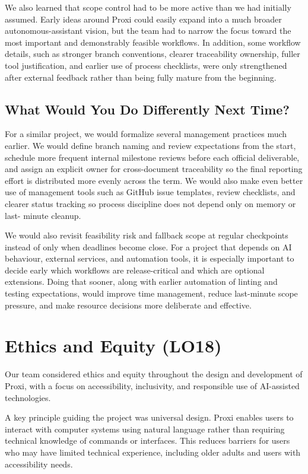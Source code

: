 \documentclass{article}
\begin{document}
We also learned that scope control had to be more active than we had
initially assumed. Early ideas around Proxi could easily expand into a
much broader autonomous-assistant vision, but the team had to narrow the
focus toward the most important and demonstrably feasible workflows. In
addition, some workflow details, such as stronger branch conventions,
clearer traceability ownership, fuller tool justification, and earlier
use of process checklists, were only strengthened after external
feedback rather than being fully mature from the beginning.

\subsection{What Would You Do Differently Next Time?}

For a similar project, we would formalize several management practices
much earlier. We would define branch naming and review expectations from
the start, schedule more frequent internal milestone reviews before each
official deliverable, and assign an explicit owner for cross-document
traceability so the final reporting effort is distributed more evenly
across the term. We would also make even better use of management tools
such as GitHub issue templates, review checklists, and clearer status
tracking so process discipline does not depend only on memory or last-
minute cleanup.

We would also revisit feasibility risk and fallback scope at regular
checkpoints instead of only when deadlines become close. For a project
that depends on AI behaviour, external services, and automation tools,
it is especially important to decide early which workflows are
release-critical and which are optional extensions. Doing that sooner,
along with earlier automation of linting and testing expectations, would
improve time management, reduce last-minute scope pressure, and make
resource decisions more deliberate and effective.

\section{Ethics and Equity (LO18)}

Our team considered ethics and equity throughout the design and
development of Proxi, with a focus on accessibility, inclusivity, and
responsible use of AI-assisted technologies.

A key principle guiding the project was universal design. Proxi enables
users to interact with computer systems using natural language rather
than requiring technical knowledge of commands or interfaces. This
reduces barriers for users who may have limited technical experience,
including older adults and users with accessibility needs.
\end{document}
